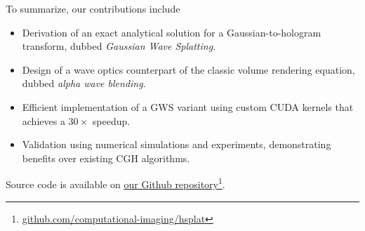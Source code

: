 
To summarize, our contributions include
\begin{itemize}
    \item Derivation of an exact analytical solution for a Gaussian-to-hologram transform, dubbed \textit{Gaussian Wave Splatting}.
    \item Design of a wave optics counterpart of the classic volume rendering equation, dubbed \textit{alpha wave blending}.
    \item Efficient implementation of a GWS variant using custom CUDA kernels that achieves a $30\times$ speedup.
    \item Validation using numerical simulations and experiments, demonstrating benefits over existing CGH algorithms.
\end{itemize}
Source code is available on \href{https://github.com/computational-imaging/hsplat}{our Github repository}\footnote{\href{https://github.com/computational-imaging/hsplat}{github.com/computational-imaging/hsplat}}.
